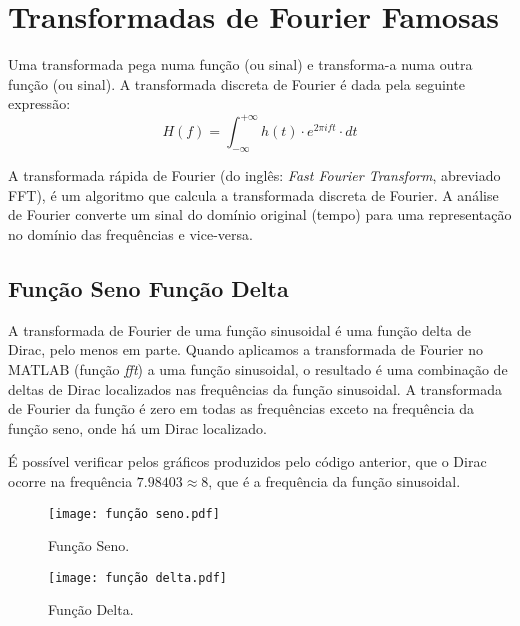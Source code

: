 \section{Transformadas de Fourier Famosas}

Uma transformada pega numa função (ou sinal) e transforma-a numa outra função (ou sinal).
A transformada discreta de Fourier é dada pela seguinte expressão:
\begin{equation}
    H(f)=\int_{-\infty}^{+\infty} h(t)\cdot e^{2\pi ift} \cdot dt 
\end{equation}

A transformada rápida de Fourier (do inglês: \emph{Fast Fourier Transform}, abreviado FFT), é um algoritmo que calcula a transformada discreta de Fourier. A análise de Fourier converte um sinal do domínio original (tempo) para uma representação no domínio das frequências e vice-versa.

\subsection{Função Seno \boldmath{$\rightarrow$} Função Delta} 

A transformada de Fourier de uma função sinusoidal é uma função delta de Dirac, pelo menos em parte. Quando aplicamos a transformada de Fourier no MATLAB (função \emph{fft}) a uma função sinusoidal, o resultado é uma combinação de deltas de Dirac localizados nas frequências da função sinusoidal. A transformada de Fourier da função é zero em todas as frequências exceto na frequência da função seno, onde há um Dirac localizado.



\newpage

É possível verificar pelos gráficos produzidos pelo código anterior, que o Dirac ocorre na frequência $7.98403\approx 8$, que é a frequência da função sinusoidal.

\begin{figure}[!ht]
    \centering
    \begin{minipage}[b]{0.49\textwidth}
        \centering
        \texttt{[image: função seno.pdf]}
        \caption{Função Seno.}
    \end{minipage}
    \hfill
    \begin{minipage}[b]{0.49\textwidth}
        \centering
        \texttt{[image: função delta.pdf]}
        \caption{Função Delta.}
    \end{minipage}
\end{figure}

